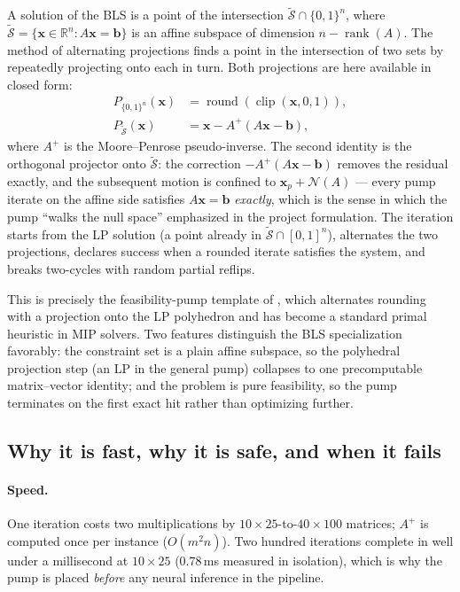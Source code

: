\documentclass[12pt]{article}
\begin{document}
A solution of the BLS is a point of the intersection $\tilde{\mathcal{S}} \cap \{0,1\}^n$, where $\tilde{\mathcal{S}} = \{\mathbf{x} \in \mathbb{R}^n : A\mathbf{x} = \mathbf{b}\}$ is an affine subspace of dimension $n - \operatorname{rank}(A)$. The method of alternating projections \citep{bauschke1996projection} finds a point in the intersection of two sets by repeatedly projecting onto each in turn. Both projections are here available in closed form:
\begin{align*}
P_{\{0,1\}^n}(\mathbf{x}) &= \operatorname{round}(\operatorname{clip}(\mathbf{x}, 0, 1)), \\
P_{\tilde{\mathcal{S}}}(\mathbf{x}) &= \mathbf{x} - A^{+}(A\mathbf{x} - \mathbf{b}),
\end{align*}
where $A^{+}$ is the Moore--Penrose pseudo-inverse. The second identity is the orthogonal projector onto $\tilde{\mathcal{S}}$: the correction $-A^{+}(A\mathbf{x}-\mathbf{b})$ removes the residual exactly, and the subsequent motion is confined to $\mathbf{x}_p + \mathcal{N}(A)$ --- every pump iterate on the affine side satisfies $A\mathbf{x} = \mathbf{b}$ \emph{exactly}, which is the sense in which the pump ``walks the null space'' emphasized in the project formulation. The iteration starts from the LP solution (a point already in $\tilde{\mathcal{S}} \cap [0,1]^n$), alternates the two projections, declares success when a rounded iterate satisfies the system, and breaks two-cycles with random partial reflips.

This is precisely the feasibility-pump template of \citet{fischetti2005feasibility}, which alternates rounding with a projection onto the LP polyhedron and has become a standard primal heuristic in MIP solvers. Two features distinguish the BLS specialization favorably: the constraint set is a plain affine subspace, so the polyhedral projection step (an LP in the general pump) collapses to one precomputable matrix--vector identity; and the problem is pure feasibility, so the pump terminates on the first exact hit rather than optimizing further.

\subsection{Why it is fast, why it is safe, and when it fails}

\paragraph{Speed.} One iteration costs two multiplications by $10 \times 25$-to-$40 \times 100$ matrices; $A^{+}$ is computed once per instance ($O(m^2 n)$). Two hundred iterations complete in well under a millisecond at $10 \times 25$ (0.78\,ms measured in isolation), which is why the pump is placed \emph{before} any neural inference in the pipeline.
\end{document}
